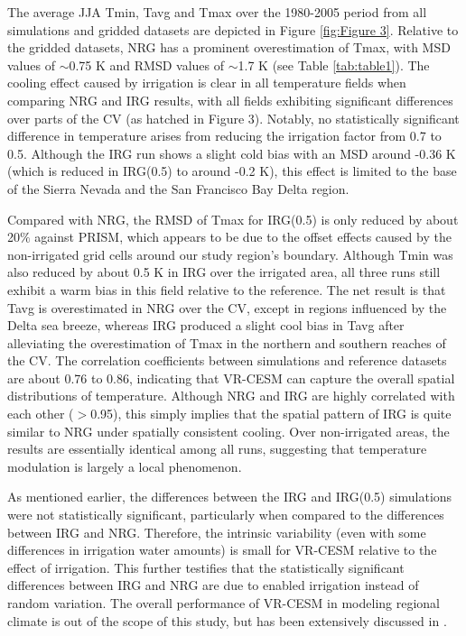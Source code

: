 \documentclass[draft,ms]{agutex}   %
\begin{document}
\begin{article}
The average JJA Tmin, Tavg and Tmax over the 1980-2005 period from all simulations and gridded datasets are depicted in Figure \ref{fig:Figure 3}. Relative to the gridded datasets, NRG has a prominent overestimation of Tmax, with MSD values of $\sim$0.75 K and RMSD values of $\sim$1.7 K (see Table \ref{tab:table1}). The cooling effect caused by irrigation is clear in all temperature fields when comparing NRG and IRG results, with all fields exhibiting significant differences over parts of the CV (as hatched in Figure 3). Notably, no statistically significant difference in temperature arises from reducing the irrigation factor from 0.7 to 0.5. Although the IRG run shows a slight cold bias with an MSD around -0.36 K (which is reduced in IRG(0.5) to around -0.2 K), this effect is limited to the base of the Sierra Nevada and the San Francisco Bay Delta region.

Compared with NRG, the RMSD of Tmax for IRG(0.5) is only reduced by about 20$\%$ against PRISM, which appears to be due to the offset effects caused by the non-irrigated grid cells around our study region's boundary. Although Tmin was also reduced by about 0.5 K in IRG over the irrigated area, all three runs still exhibit a warm bias in this field relative to the reference. The net result is that Tavg is overestimated in NRG over the CV, except in regions influenced by the Delta sea breeze, whereas IRG produced a slight cool bias in Tavg after alleviating the overestimation of Tmax in the northern and southern reaches of the CV. The correlation coefficients between simulations and reference datasets are about 0.76 to 0.86, indicating that VR-CESM can capture the overall spatial distributions of temperature. Although NRG and IRG are highly correlated with each other ($>$0.95), this simply implies that the spatial pattern of IRG is quite similar to NRG under spatially consistent cooling. Over non-irrigated areas, the results are essentially identical among all runs, suggesting that temperature modulation is largely a local phenomenon.

As mentioned earlier, the differences between the IRG and IRG(0.5) simulations were not statistically significant, particularly when compared to the differences between IRG and NRG. Therefore, the intrinsic variability (even with some differences in irrigation water amounts) is small for VR-CESM relative to the effect of irrigation. This further testifies that the statistically significant differences between IRG and NRG are due to enabled irrigation instead of random variation. The overall performance of VR-CESM in modeling regional climate is out of the scope of this study, but has been extensively discussed in \citep{huang2016evaluation}.


\end{article}
\end{document}
